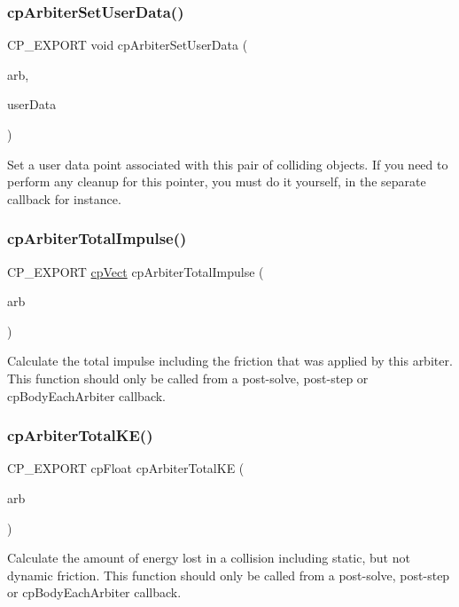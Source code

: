 \subsubsection{\texorpdfstring{cp\+Arbiter\+Set\+User\+Data()}{cpArbiterSetUserData()}}
{\footnotesize\ttfamily C\+P\+\_\+\+E\+X\+P\+O\+RT void cp\+Arbiter\+Set\+User\+Data (\begin{DoxyParamCaption}\item[{\hyperlink{structcpArbiter}{cp\+Arbiter} $\ast$}]{arb,  }\item[{\hyperlink{group__basicTypes_ga2ac2c3c31e21893941f9e4f8ee279447}{cp\+Data\+Pointer}}]{user\+Data }\end{DoxyParamCaption})}

Set a user data point associated with this pair of colliding objects. If you need to perform any cleanup for this pointer, you must do it yourself, in the separate callback for instance. \mbox{\label{group__cpArbiter_ga7dcf707be34b3ecddba4d61ff9d11415}} 
\subsubsection{\texorpdfstring{cp\+Arbiter\+Total\+Impulse()}{cpArbiterTotalImpulse()}}
{\footnotesize\ttfamily C\+P\+\_\+\+E\+X\+P\+O\+RT \hyperlink{structcpVect}{cp\+Vect} cp\+Arbiter\+Total\+Impulse (\begin{DoxyParamCaption}\item[{const \hyperlink{structcpArbiter}{cp\+Arbiter} $\ast$}]{arb }\end{DoxyParamCaption})}

Calculate the total impulse including the friction that was applied by this arbiter. This function should only be called from a post-\/solve, post-\/step or cp\+Body\+Each\+Arbiter callback. \mbox{\label{group__cpArbiter_ga9918019bc0e4af5a2618e0ddeec4d64c}} 
\subsubsection{\texorpdfstring{cp\+Arbiter\+Total\+K\+E()}{cpArbiterTotalKE()}}
{\footnotesize\ttfamily C\+P\+\_\+\+E\+X\+P\+O\+RT cp\+Float cp\+Arbiter\+Total\+KE (\begin{DoxyParamCaption}\item[{const \hyperlink{structcpArbiter}{cp\+Arbiter} $\ast$}]{arb }\end{DoxyParamCaption})}

Calculate the amount of energy lost in a collision including static, but not dynamic friction. This function should only be called from a post-\/solve, post-\/step or cp\+Body\+Each\+Arbiter callback. 